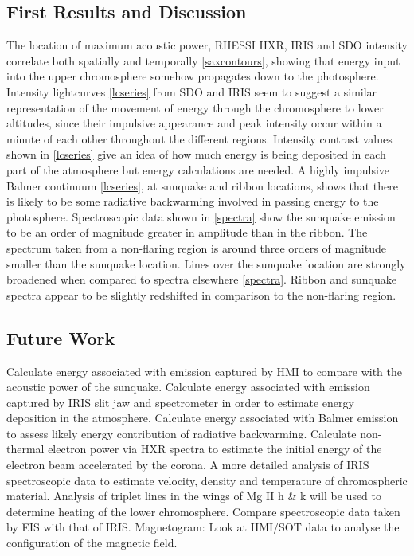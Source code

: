 \subsection{First Results and Discussion}
The location of maximum acoustic power, RHESSI HXR, IRIS and SDO intensity correlate both spatially and temporally \ref{saxcontours}, showing that energy input into the upper chromosphere somehow propagates down to the photosphere. Intensity lightcurves \ref{lcseries} from SDO and IRIS seem to suggest a similar representation of the movement of energy through the chromosphere to lower altitudes, since their impulsive appearance and peak intensity occur within a minute of each 
other throughout the different regions. Intensity contrast values shown in \ref{lcseries} give an idea of how much energy is being deposited in each part of the atmosphere but energy calculations are needed. A highly impulsive Balmer continuum \ref{lcseries}, at sunquake and ribbon locations, shows that there is likely to be some radiative backwarming involved in passing energy to the photosphere. Spectroscopic data shown in \ref{spectra} show the sunquake emission to be an order of magnitude greater in amplitude than in the ribbon. The spectrum taken from a non-flaring region is around three orders of magnitude smaller than the sunquake location. Lines over the sunquake location are strongly broadened when compared to spectra elsewhere \ref{spectra}. Ribbon and sunquake spectra appear to be slightly redshifted in comparison to the non-flaring region.\\


\subsection{Future Work}
Calculate energy associated with emission captured by HMI to compare with the acoustic power of the sunquake. Calculate energy associated with emission captured by IRIS slit jaw and spectrometer in order to estimate energy deposition in the atmosphere. Calculate energy associated with Balmer emission to assess likely energy contribution of radiative backwarming. Calculate non-thermal electron power via HXR spectra to estimate the initial energy of the electron beam accelerated by the corona. A more detailed analysis of IRIS spectroscopic data to estimate velocity, density and temperature of chromospheric material. Analysis of triplet lines in the wings of Mg II h \& k will be used to determine heating of the lower chromosphere. Compare spectroscopic data taken by EIS with that of IRIS. Magnetogram: Look at HMI/SOT data to analyse the configuration of the magnetic field.\\

